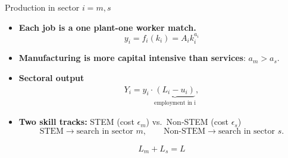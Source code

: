 \documentclass[9pt,xcolor={svgnames}]{beamer}
\begin{document}
\begin{frame}{Production in sector $i=m,s$}
  \begin{itemize}
    \item \textbf{Each job is a one plant-one worker match.} %
      \[
        y_i  =  f_i(k_i)  =A_i k_i^{a_i}
      \]
    
      \medskip
      \item \textbf{Manufacturing is more capital intensive than services}: $a_m > a_s$.
    
    
    \medskip
    \item \textbf{Sectoral output}
      \begin{align*}
       Y_i = y_i \cdot  \underbrace{(L_i-u_i)}_{\text{employment in i}},
      \end{align*}
    \medskip

   \item \textbf{Two skill tracks:} STEM (cost $\epsilon_m$) vs.\ Non‐STEM (cost $\epsilon_s$) 
      \[
        \text{STEM} \to \text{search in sector }m ,\quad \quad 
        \text{Non‐STEM} \to \text{search in sector }s.
      \]

 \begin{align*}
     L_m+L_s=L
 \end{align*}

 
  \end{itemize}
\end{frame}
\end{document}
